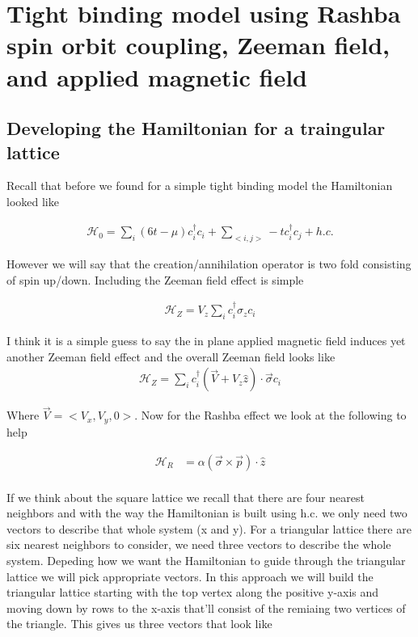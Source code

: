 \chapter{Tight binding model using Rashba spin orbit coupling, Zeeman field, and applied magnetic field}
\section{Developing the Hamiltonian for a traingular lattice}

Recall that before we found for a simple tight binding model the Hamiltonian looked like

\begin{align}
  \mathcal{H}_0 = \sum\limits_{i} (6t-\mu)c^{\dagger}_{i}c_{i} + \sum\limits_{<i,j>} -tc^{\dagger}_{i}c_{j} + h.c.
\end{align}

However we will say that the creation/annihilation operator is two fold consisting of spin up/down. Including the Zeeman field effect is simple 

\begin{align}
  \mathcal{H}_Z = V_z\sum\limits_ic^{\dagger}_i \sigma_z c_i
\end{align}

I think it is a simple guess to say the in plane applied magnetic field induces yet another Zeeman field effect and the overall Zeeman field looks like 
\begin{align}
  \mathcal{H}_Z = \sum\limits_i c^{\dagger}_i (\vec{V}+V_z\hat{z})\cdot \vec{\sigma} c_i
\end{align}

Where $\vec{V} = <V_x,V_y,0>$. Now for the Rashba effect we look at the following to help 

\begin{align}
  \mathcal{H}_R &= \alpha (\vec{\sigma}\times \vec{p}) \cdot \hat{z} \\
\end{align}

If we think about the square lattice we recall that there are four nearest neighbors and with the way the Hamiltonian is built using h.c. we only need two vectors to describe that whole system (x and y). For a triangular lattice there are six nearest neighbors to consider, we need three vectors to describe the whole system. Depeding how we want the Hamiltonian to guide through the triangular lattice we will pick appropriate vectors. In this approach we will build the triangular lattice starting with the top vertex along the positive y-axis and moving down by rows to the x-axis that'll consist of the remiaing two vertices of the triangle. This gives us three vectors that look like

